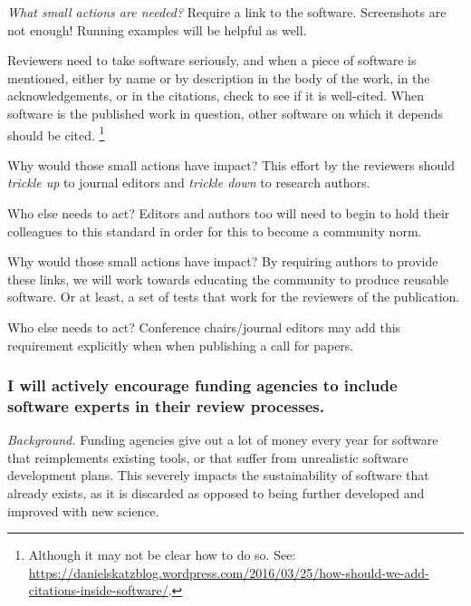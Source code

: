 \documentclass[a4paper,UKenglish]{dagman}
\renewcommand{\paragraph}[1]{\subsubsection*{#1}\xspace}
\begin{document}
\emph{What small actions are needed?}
Require a link to the software. Screenshots are not enough! Running examples will be helpful as well.

Reviewers need to take software seriously, and when a piece of software is mentioned, either by name or by description in the body of the work, in the acknowledgements, or in the citations, check to see if it is well-cited.  When software is the published work in question, other software on which it depends should be cited.%
\footnote{Although it may not be clear how to do so. See:\\ \url{https://danielskatzblog.wordpress.com/2016/03/25/how-should-we-add-citations-inside-software/}.}


Why would those small actions have impact? This effort by the reviewers should \emph{trickle up} to journal editors and \emph{trickle down} to research authors.

Who else needs to act? Editors and authors too will need to begin to hold their colleagues to this standard in order for this to become a community norm.

Why would those small actions have impact? By requiring authors to provide these links, we will work towards educating the community to produce reusable software. Or at least, a set of tests that work for the reviewers of the publication. 

Who else needs to act? Conference chairs/journal editors may add this requirement explicitly when when publishing a call for papers. 


\paragraph{I will actively encourage funding agencies to include software experts in their review processes.}


\emph{Background.}
Funding agencies give out a lot of money every year for software that reimplements existing tools, or that suffer from unrealistic software development plans. This severely impacts the sustainability of software that already exists, as it is discarded as opposed to being further developed and improved with new science.
\end{document}
